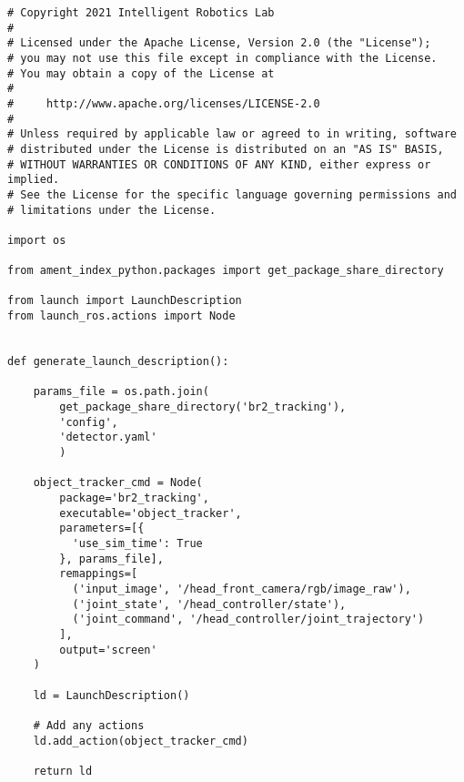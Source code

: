  \footnotesize
\begin{tcolorbox}[sharp corners, colframe=gray!80, colback=LightGray, left=0pt, top=0pt, bottom=0pt, title=\texttt{br2\_tracking/launch/tracking.launch.py}]
  \begin{verbatim}
# Copyright 2021 Intelligent Robotics Lab
#
# Licensed under the Apache License, Version 2.0 (the "License");
# you may not use this file except in compliance with the License.
# You may obtain a copy of the License at
#
#     http://www.apache.org/licenses/LICENSE-2.0
#
# Unless required by applicable law or agreed to in writing, software
# distributed under the License is distributed on an "AS IS" BASIS,
# WITHOUT WARRANTIES OR CONDITIONS OF ANY KIND, either express or implied.
# See the License for the specific language governing permissions and
# limitations under the License.

import os

from ament_index_python.packages import get_package_share_directory

from launch import LaunchDescription
from launch_ros.actions import Node


def generate_launch_description():

    params_file = os.path.join(
        get_package_share_directory('br2_tracking'),
        'config',
        'detector.yaml'
        )

    object_tracker_cmd = Node(
        package='br2_tracking',
        executable='object_tracker',
        parameters=[{
          'use_sim_time': True
        }, params_file],
        remappings=[
          ('input_image', '/head_front_camera/rgb/image_raw'),
          ('joint_state', '/head_controller/state'),
          ('joint_command', '/head_controller/joint_trajectory')
        ],
        output='screen'
    )

    ld = LaunchDescription()

    # Add any actions
    ld.add_action(object_tracker_cmd)

    return ld
    \end{verbatim}
    \end{tcolorbox}
  \normalsize

